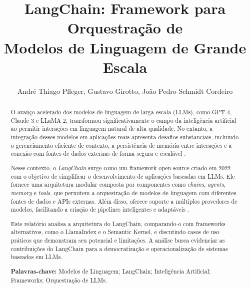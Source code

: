 \documentclass[12pt]{article}
\title{LangChain: Framework para Orquestração de \\ Modelos de Linguagem de Grande Escala}
\author{
  André Thiago Pfleger\inst{1}, Gustavo Girotto\inst{1}, João Pedro Schmidt Cordeiro\inst{1}
}
\begin{document}
\maketitle


\begin{abstract}


O avanço acelerado dos modelos de linguagem de larga escala (LLMs), como GPT-4, Claude 3 e LLaMA 2, transformou significativamente o campo da inteligência artificial ao permitir interações em linguagem natural de alta qualidade. No entanto, a integração desses modelos em aplicações reais apresenta desafios substanciais, incluindo o gerenciamento eficiente de contexto, a persistência de memória entre interações e a conexão com fontes de dados externas de forma segura e escalável \cite{openai2023gpt4, touvron2023llama, anthropic2023claude}.

Nesse contexto, o \textit{LangChain} surge como um framework open-source criado em 2022 com o objetivo de simplificar o desenvolvimento de aplicações baseadas em LLMs. Ele fornece uma arquitetura modular composta por componentes como \textit{chains}, \textit{agents}, \textit{memory} e \textit{tools}, que permitem a orquestração de modelos de linguagem com diferentes fontes de dados e APIs externas. Além disso, oferece suporte a múltiplos provedores de modelos, facilitando a criação de pipelines inteligentes e adaptáveis \cite{langchain2023docs, langchain2023github}.

Este relatório analisa a arquitetura do LangChain, comparando-o com frameworks alternativos, como o LlamaIndex e o Semantic Kernel, e discutindo casos de uso práticos que demonstram seu potencial e limitações. A análise busca evidenciar as contribuições do LangChain para a democratização e operacionalização de sistemas baseados em LLMs.

\textbf{Palavras-chave:} Modelos de Linguagem; LangChain; Inteligência Artificial; Frameworks; Orquestração de LLMs.


\end{abstract}
\end{document}
